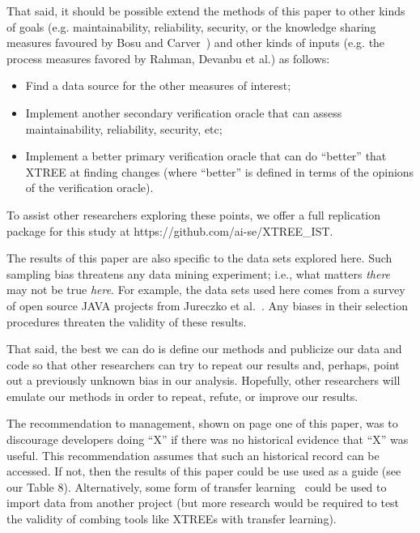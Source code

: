 \documentclass[twocolumn,5p]{elsarticle}
\newcommand{\bi}{\begin{itemize}[leftmargin=0.4cm]}
\newcommand{\ei}{\end{itemize}}
\theoremstyle{break}
\begin{document}
	That said, it should be possible extend the methods of this paper to other kinds of goals (e.g. maintainability, reliability, security,
	or the knowledge sharing measures favoured by Bosu and Carver~\cite{bosu13}) and other kinds of inputs (e.g. the process measures favored by Rahman, Devanbu et al.\cite{Rahman2013})  as follows:
	\bi
	\item Find a data source for the other measures of interest;
	\item Implement another secondary verification oracle that can assess maintainability, reliability, security, etc;
	\item Implement a better primary verification oracle that can do ``better'' that XTREE at finding changes (where ``better'' is defined in terms 
	of the opinions of the verification oracle).
	\ei
	To assist other researchers exploring these points, we offer a full replication package for this study at  https://github.com/ai-se/XTREE\_IST.
	
	The results of this paper are also specific to the data sets explored here.
	Such sampling bias threatens any data mining experiment; i.e., what matters
	{\em there} may not be true {\em here}. For example, the data sets used here comes from a survey of
	open source JAVA projects from Jureczko et al.~\cite{jureczko10}. Any biases in their selection procedures
	threaten the validity of these results. 
	
	That said,
	the best we can do is define our methods and publicize our data and code so that other researchers can
	try to repeat our results and, perhaps, point out a previously unknown bias
	in our analysis. Hopefully, other researchers will emulate our methods in
	order to repeat, refute, or improve our results. 
	
	The recommendation to management, shown on page one of this paper,  was to discourage developers doing ``X'' if there was no historical evidence that ``X'' was useful. 
	This recommendation assumes that such an  historical record can be accessed. If not,  then the results of this paper could be use used as a guide (see our Table 8). Alternatively, some form of transfer learning~\cite{Nam15,Jing15,krishna16} could be used to import data from another project (but more research would be required to test the validity of combing tools like XTREEs with transfer learning). 
	
	
	
	
\end{document}
